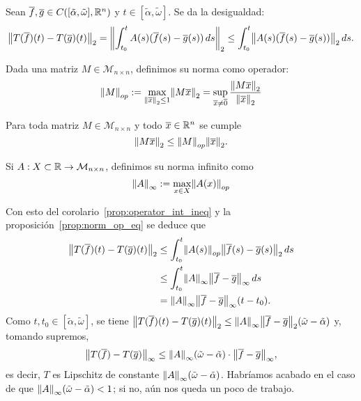 \documentclass[../ecuaciones_diferenciales.tex]{subfiles}
\begin{document}
\begin{corollary} \label{prop:operator_int_ineq}
	Sean \(\overline{f}, \overline{g} \in C([\tilde{\alpha}, \tilde{\omega}], \mathbb{R}^n)\) y 
	\(t \in [\tilde{\alpha}, \tilde{\omega}]\). Se da la desigualdad:
	\[\norm{T(\vec{f})(t) - T(\vec{g})(t)}_2 
		= \norm{\int_{t_0}^t A(s)(\vec{f}(s) - \vec{g}(s)) \dif s}_2 
		\leq \int_{t_0}^t \norm{A(s)(\vec{f}(s) - \vec{g}(s))}_2 \dif s.\]
\end{corollary}

\begin{definition}
	Dada una matriz \(M \in \mathcal{M}_{n \times n}\), definimos su norma 
	como operador:
	\[\norm{M}_{op} := \max_{\norm{\vec{x}}_2 \leq 1} \norm{M \vec{x}}_2 
		= \sup_{\vec{x} \neq \vec{0}}
			\frac{\norm{M \vec{x}}_2}{\norm{\vec{x}}_2}\]
\end{definition}

\begin{proposition} \label{prop:norm_op_eq}
	Para toda matriz \(M \in \mathcal{M}_{n \times n}\) y todo 
	\(\overline{x} \in \mathbb{R}^n\) se cumple 
	\[\norm{M \vec{x}}_2 \leq \norm{M}_{op} \norm{\vec{x}}_2.\]
\end{proposition}

\begin{definition}
	Si \(A : X \subset \mathbb{R} \to \mathcal{M}_{n \times n}\), definimos su norma 
	infinito como
	\[\norm{A}_\infty := \max_{x \in X} \norm{A(x)}_{op}\]
\end{definition}

Con esto del corolario~\ref{prop:operator_int_ineq} y la 
proposición~\ref{prop:norm_op_eq} se deduce que
\begin{align*}
	\norm{T(\vec{f})(t) - T(\vec{g})(t)}_2 
	&\leq \int_{t_0}^t \norm{A(s)}_{op} \norm{\vec{f}(s) - \vec{g}(s)}_2 \dif s
	\\
	&\leq \int_{t_0}^t \norm{A}_\infty \norm{\vec{f} - \vec{g}}_\infty \dif s \\
	&= \norm{A}_\infty\norm{\vec{f} - \vec{g}}_\infty(t - t_0).
\end{align*}
Como \(t, t_0 \in [\tilde{\alpha}, \tilde{\omega}]\), se tiene
\(\norm{T(\vec{f})(t) - T(\vec{g})(t)}_2 
	\leq \norm{A}_\infty\norm{\vec{f} - \vec{g}}_2 
		(\tilde{\omega} - \tilde{\alpha})\) y, tomando supremos, 
\[\norm{T(\vec{f}) - T(\vec{g})}_\infty 
	\leq \norm{A}_\infty(\tilde{\omega} 
	- \tilde{\alpha}) \cdot \norm{\vec{f} - \vec{g}}_\infty,\]
es decir, \(T\) es Lipschitz de
constante \(\norm{A}_\infty(\tilde{\omega}-\tilde{\alpha})\). Habríamos
acabado en el caso de que 
\(\norm{A}_\infty(\tilde{\omega}-\tilde{\alpha}) < 1\); si no, aún nos queda un
poco de trabajo.
\end{document}
